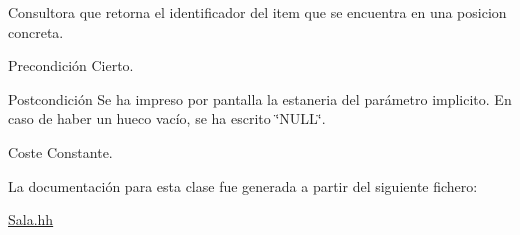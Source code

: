 Consultora que retorna el identificador del item que se encuentra en una posicion concreta. 

\begin{DoxyPrecond}{Precondición}
Cierto. 
\end{DoxyPrecond}
\begin{DoxyPostcond}{Postcondición}
Se ha impreso por pantalla la estaneria del parámetro implicito. En caso de haber un hueco vacío, se ha escrito \char`\"{}\+N\+U\+L\+L\char`\"{}. 
\end{DoxyPostcond}
\begin{DoxyParagraph}{Coste}
Constante. 
\end{DoxyParagraph}


La documentación para esta clase fue generada a partir del siguiente fichero\+:\begin{DoxyCompactItemize}
\item 
\hyperlink{_sala_8hh}{Sala.\+hh}\end{DoxyCompactItemize}
